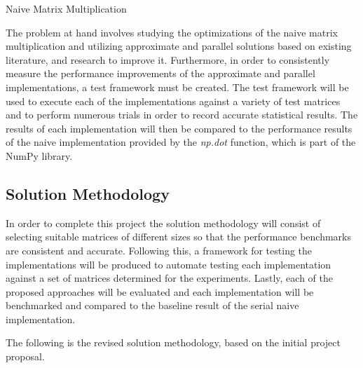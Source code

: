 \documentclass[oneside]{article}
\begin{document}
\begin{algorithm}[!ht]
  \SetAlgoNoLine
  \DontPrintSemicolon
  
\caption{Naive Matrix Multiplication}
\label{alg:naive}
\end{algorithm}


The problem at hand involves studying the optimizations of the naive matrix multiplication and utilizing approximate and parallel solutions based on existing literature, and research to improve it. Furthermore, in order to consistently measure the performance improvements of the approximate and parallel implementations, a test framework must be created. The test framework will be used to execute each of the implementations against a variety of test matrices and to perform numerous trials in order to record accurate statistical results. The results of each implementation will then be compared to the performance results of the naive implementation provided by the \emph{np.dot} function, which is part of the NumPy library.




\subsection{Solution Methodology}

In order to complete this project the solution methodology will consist of selecting suitable matrices of different sizes so that the performance benchmarks are consistent and accurate. Following this, a framework for testing the implementations will be produced to automate testing each implementation against a set of matrices determined for the experiments. Lastly, each of the proposed approaches will be evaluated and each implementation will be benchmarked and compared to the baseline result of the serial naive implementation.

The following is the revised solution methodology, based on the initial project proposal.
\end{document}
